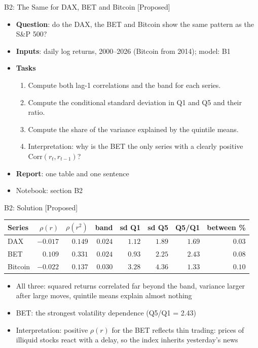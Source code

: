 \begin{frame}{B2: The Same for DAX, BET and Bitcoin [Proposed]}
\itemsize{\footnotesize}
\begin{itemize}
\item \textbf{Question}: do the DAX, the BET and Bitcoin show the same pattern as the S\&P 500?
\item \textbf{Inputs}: daily log returns, 2000--2026 (Bitcoin from 2014); model: B1
\item \textbf{Tasks}
\begin{enumerate}
    \item Compute both lag-1 correlations and the band for each series.
    \item Compute the conditional standard deviation in Q1 and Q5 and their ratio.
    \item Compute the share of the variance explained by the quintile means.
    \item Interpretation: why is the BET the only series with a clearly positive $\text{Corr}(r_t, r_{t-1})$?
\end{enumerate}
\item \textbf{Report}: one table and one sentence
\item Notebook: section B2
\end{itemize}
\end{frame}

\ifsolutions
\begin{frame}{B2: Solution [Proposed]}
\itemsize{\footnotesize}
\begin{center}
\footnotesize
\begin{tabular}{lrrrrrrr}
\toprule
Series & $\rho(r)$ & $\rho(r^2)$ & band & sd Q1 & sd Q5 & Q5/Q1 & between \% \\
\midrule
DAX & $-0.017$ & $0.149$ & $0.024$ & $1.12$ & $1.89$ & $1.69$ & $0.03$ \\
BET & $0.109$ & $0.331$ & $0.024$ & $0.93$ & $2.25$ & $2.43$ & $0.08$ \\
Bitcoin & $-0.022$ & $0.137$ & $0.030$ & $3.28$ & $4.36$ & $1.33$ & $0.10$ \\
\bottomrule
\end{tabular}
\end{center}
\begin{itemize}
    \item All three: squared returns correlated far beyond the band, variance larger after large moves, quintile means explain almost nothing
    \item BET: the strongest volatility dependence (Q5/Q1 = 2.43)
    \item Interpretation: positive $\rho(r)$ for the BET reflects thin trading: prices of illiquid stocks react with a delay, so the index inherits yesterday's news
\end{itemize}
\end{frame}
\fi

